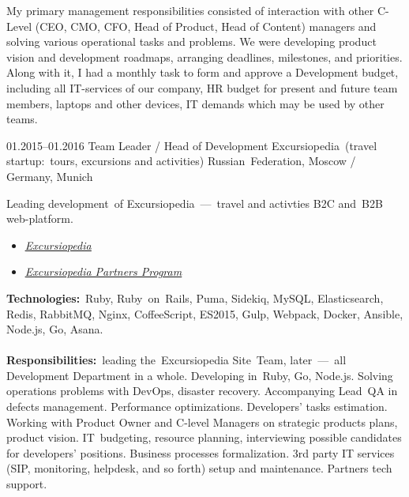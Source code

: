 \documentclass[12pt,a4paper,final]{moderncv}
\begin{document}
{{    My primary management responsibilities consisted of interaction with other C-Level (CEO, CMO, CFO, Head of Product, Head of Content) managers and solving various operational tasks and problems. We were developing product vision and development roadmaps, arranging deadlines, milestones, and priorities. Along with it, I had a monthly task to form and approve a Development budget, including all IT-services of our company, HR budget for present and future team members, laptops and other devices, IT demands which may be used by other teams.
  }
}

\cventry
{01.2015--01.2016}
{Team Leader / Head of Development}
{Excursiopedia~(travel startup:~tours, excursions and activities)}
{Russian~Federation, Moscow / Germany, Munich}
{}
{
  Leading development~of Excursiopedia~---~travel and activties B2C and~B2B web-platform.
  \bigskip
  \begin{itemize}
    \item \underline{\href{https://www.excursiopedia.com}{\itshape Excursiopedia}}
    \item \underline{\href{https://partners.excursiopedia.com}{\itshape Excursiopedia Partners Program}}
  \end{itemize}
  \bigskip
  \textbf{Technologies:}~Ruby, Ruby~on~Rails, Puma, Sidekiq, MySQL, Elasticsearch, Redis, RabbitMQ, Nginx, CoffeeScript, ES2015, Gulp, Webpack, Docker, Ansible, Node.js, Go, Asana.
  \\\\
  \textbf{Responsibilities:}~leading the~Excursiopedia Site~Team, later~---~all Development Department in a whole. Developing in~Ruby, Go, Node.js. Solving operations problems with DevOps, disaster recovery. Accompanying Lead~QA in defects management. Performance optimizations. Developers' tasks estimation. Working with Product Owner and C-level Managers on strategic products plans, product vision. IT~budgeting, resource planning, interviewing possible candidates for developers' positions. Business processes formalization. 3rd party IT services (SIP, monitoring, helpdesk, and so forth) setup and maintenance. Partners tech support.
}
\end{document}
